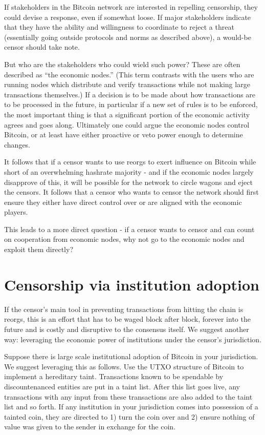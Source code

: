 \documentclass{article}%
\begin{document}
If stakeholders in the Bitcoin network are interested in repelling
censorship, they could devise a response, even if somewhat loose.  If major
stakeholders indicate that they have the ability and willingness to coordinate to reject a threat (essentially
going outside protocols and norms as described above), a would-be censor should take note.

But who are the stakeholders who could wield such power?  These are often
described as \textquotedblleft the economic nodes.'' (This term contrasts with
the users who are running nodes which distribute and verify
transactions while not making large transactions themselves.)   If a decision is to be made about how transactions are to be processed in
the future, in particular if a new set of rules is to be enforced, the most
important thing is that a significant portion of the economic activity agrees and goes along.
Ultimately one could argue the economic nodes control Bitcoin, or at least
have either proactive or veto power enough to determine changes.

It follows that if a censor wants to use reorgs to exert
influence on Bitcoin while short of an overwhelming  hashrate majority - and if
the economic nodes largely disapprove of this, it will be possible for the
network to circle wagons and eject the censors.  It follows that a censor who
wants to censor the network should first ensure they either have direct control over or are aligned with the economic players.

This leads to a more direct question - if a censor wants to censor and can
count on cooperation from economic nodes, why not go to the economic
nodes and exploit them directly?

\section{Censorship via\label{taint} institution adoption}

If the censor's main tool in preventing transactions from hitting the chain is reorgs, this is an effort
that has to be waged block after block, forever into the future and is costly and disruptive
to the consensus itself. We suggest another way: leveraging the economic
power of institutions under the censor's jurisdiction.

Suppose there is large scale institutional adoption of Bitcoin in your
jurisdiction.  We suggest leveraging this as follows.  Use the UTXO
structure of Bitcoin to implement a hereditary taint. Transactions known to be spendable by discountenanced entities are put in a
taint list.   After this list goes live, any transactions with
any input from these transactions are also added to the taint list and so
forth.  If any institution in your jurisdiction comes into possession of a
tainted coin, they are directed to 1) turn the coin over and 2) ensure
nothing of value was given to the sender in exchange for the coin.
\end{document}
